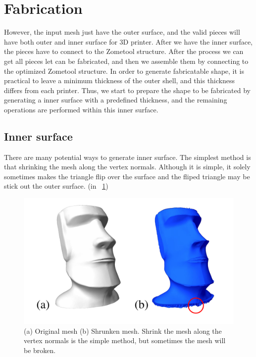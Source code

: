 \section{Fabrication}
\label{sec:fab}

However, the input mesh just have the outer surface, and the valid pieces will have both outer and inner surface for 3{D} printer. 
After we have the inner surface, the pieces have to connect to the Zometool structure. After the process we can get all pieces let can be fabricated, and then we assemble them by connecting to the optimized Zometool structure.
In order to generate fabricatable shape, it is practical to leave a minimum thickness of the outer shell, and this thickness differs from each printer.
Thus, we start to prepare the shape to be fabricated by generating a inner surface with a predefined thickness, and the remaining operations are performed within this inner surface.
    
\subsection{Inner surface}
There are many potential ways to generate inner surface. The simplest method is that shrinking the mesh along the vertex normals.
Although it is simple, it solely sometimes makes the triangle flip over the surface and the fliped triangle may be stick out the outer surface. (in \figname~\ref{fig:shrink_mesh})

\begin{figure}[ht]
\centering
\includegraphics[width=1.0\linewidth]{figs/Shrink_mesh.pdf} 
\caption{(a) Original mesh (b) Shrunken mesh. Shrink the mesh along the vertex normals is the simple method, but sometimes the mesh will be broken.}
\label{fig:shrink_mesh}
\end{figure}

